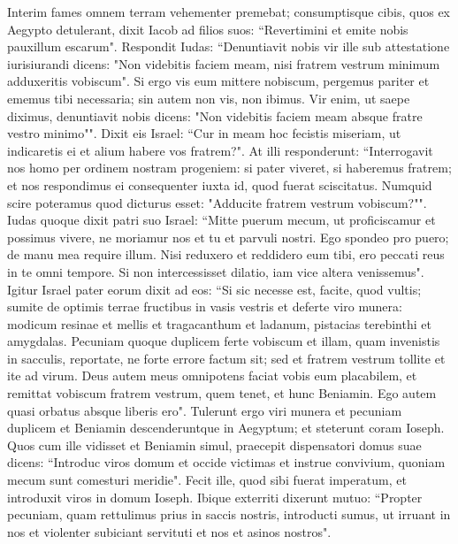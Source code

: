 \begin{biblechapter}  
\verse Interim fames omnem terram vehementer premebat; 
\verse consumptisque cibis, quos ex Aegypto detulerant, dixit Iacob ad filios suos: “Revertimini et emite nobis pauxillum escarum". 
\verse Respondit Iudas: “Denuntiavit nobis vir ille sub attestatione iurisiurandi dicens: "Non videbitis faciem meam, nisi fratrem vestrum minimum adduxeritis vobiscum". 
\verse Si ergo vis eum mittere nobiscum, pergemus pariter et ememus tibi necessaria; 
\verse sin autem non vis, non ibimus. Vir enim, ut saepe diximus, denuntiavit nobis dicens: "Non videbitis faciem meam absque fratre vestro minimo"". 
\verse Dixit eis Israel: “Cur in meam hoc fecistis miseriam, ut indicaretis ei et alium habere vos fratrem?". 
\verse At illi responderunt: “Interrogavit nos homo per ordinem nostram progeniem: si pater viveret, si haberemus fratrem; et nos respondimus ei consequenter iuxta id, quod fuerat sciscitatus. Numquid scire poteramus quod dicturus esset: "Adducite fratrem vestrum vobiscum?"". 
\verse Iudas quoque dixit patri suo Israel: “Mitte puerum mecum, ut proficiscamur et possimus vivere, ne moriamur nos et tu et parvuli nostri. 
\verse Ego spondeo pro puero; de manu mea require illum. Nisi reduxero et reddidero eum tibi, ero peccati reus in te omni tempore. 
\verse Si non intercessisset dilatio, iam vice altera venissemus". 
\verse Igitur Israel pater eorum dixit ad eos: “Si sic necesse est, facite, quod vultis; sumite de optimis terrae fructibus in vasis vestris et deferte viro munera: modicum resinae et mellis et tragacanthum et ladanum, pistacias terebinthi et amygdalas. 
\verse Pecuniam quoque duplicem ferte vobiscum et illam, quam invenistis in sacculis, reportate, ne forte errore factum sit;  
\verse sed et fratrem vestrum tollite et ite ad virum. 
\verse Deus autem meus omnipotens faciat vobis eum placabilem, et remittat vobiscum fratrem vestrum, quem tenet, et hunc Beniamin. Ego autem quasi orbatus absque liberis ero". 
\verse Tulerunt ergo viri munera et pecuniam duplicem et Beniamin descenderuntque in Aegyptum; et steterunt coram Ioseph. 
\verse Quos cum ille vidisset et Beniamin simul, praecepit dispensatori domus suae dicens: “Introduc viros domum et occide victimas et instrue convivium, quoniam mecum sunt comesturi meridie". 
\verse Fecit ille, quod sibi fuerat imperatum, et introduxit viros in domum Ioseph. 
\verse Ibique exterriti dixerunt mutuo: “Propter pecuniam, quam rettulimus prius in saccis nostris, introducti sumus, ut irruant in nos et violenter subiciant servituti et nos et asinos nostros". 

\end{biblechapter}
